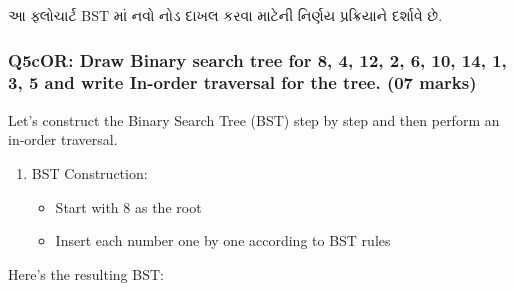 \begin{Shaded}
\begin{Highlighting}[]
\end{Highlighting}
\end{Shaded}

આ ફ્લોચાર્ટ BST માં નવો નોડ દાખલ કરવા માટેની નિર્ણય પ્રક્રિયાને દર્શાવે છે.

\hypertarget{q5cor-draw-binary-search-tree-for-8-4-12-2-6-10-14-1-3-5-and-write-in-order-traversal-for-the-tree.-07-marks}{%
\subsubsection{Q5cOR: Draw Binary search tree for 8, 4, 12, 2, 6, 10,
14, 1, 3, 5 and write In-order traversal for the tree. (07
marks)}\label{q5cor-draw-binary-search-tree-for-8-4-12-2-6-10-14-1-3-5-and-write-in-order-traversal-for-the-tree.-07-marks}}

Let's construct the Binary Search Tree (BST) step by step and then
perform an in-order traversal.

\begin{enumerate}
\def\labelenumi{\arabic{enumi}.}
\tightlist
\item
  BST Construction:

  \begin{itemize}
  \tightlist
  \item
    Start with 8 as the root
  \item
    Insert each number one by one according to BST rules
  \end{itemize}
\end{enumerate}

Here's the resulting BST:

\begin{Shaded}
\begin{Highlighting}[]

\end{Highlighting}
\end{Shaded}

